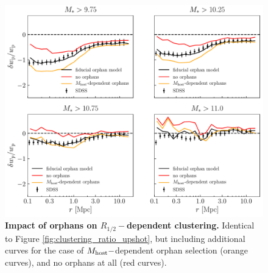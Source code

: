 \documentclass[usenatbib,usegraphicx,letterpaper]{mn2e}
\newcommand{\rhalf}{R_{1/2}}
\begin{document}
\begin{figure}
\centering
\includegraphics[width=12cm]{FIGS/clustering_ratios_orphan_impact.pdf}
\caption{
{\bf Impact of orphans on $\rhalf-$dependent clustering.}
Identical to Figure \ref{fig:clustering_ratio_upshot}, but including additional curves for the case of $M_{\rm host}-$dependent orphan selection (orange curves), and no orphans at all (red curves).
}
\label{fig:orphan_size_clustering}
\end{figure}
\end{document}
